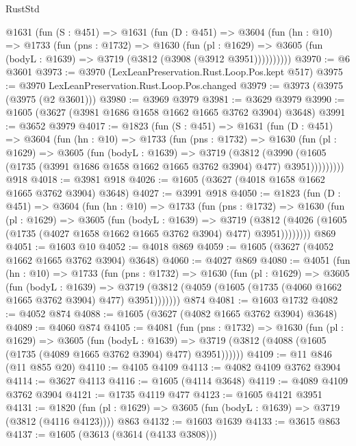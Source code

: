 \begin{lexlean}{RustStd}
\begin{coremodule}
    @1631
      (fun (S : @451) =>
      @1631
        (fun (D : @451) =>
        @3604
          (fun (hn : @10) =>
          @1733
            (fun (pns : @1732) =>
            @1630
              (fun (pl : @1629) =>
              @3605 (fun (bodyL : @1639) => @3719 (@3812 (@3908 (@3912 @3951))))))))))
@3970 := @6 @3601
@3973 := @3970 (LexLeanPreservation.Rust.Loop.Pos.kept @517)
@3975 := @3970 LexLeanPreservation.Rust.Loop.Pos.changed
@3979 := @3973 (@3975 (@3975 (@2 @3601)))
@3980 := @3969 @3979
@3981 := @3629 @3979
@3990 := @1605 (@3627 (@3981 @1686 @1658 @1662 @1665 @3762 @3904) @3648)
@3991 := @3652 @3979
@4017 := @1823
    (fun (S : @451) =>
    @1631
      (fun (D : @451) =>
      @3604
        (fun (hn : @10) =>
        @1733
          (fun (pns : @1732) =>
          @1630
            (fun (pl : @1629) =>
            @3605
              (fun (bodyL : @1639) =>
              @3719
                (@3812
                  (@3990
                    (@1605 (@1735 (@3991 @1686 @1658 @1662 @1665 @3762 @3904) @477) @3951)))))))))
    @918
@4018 := @3981 @918
@4026 := @1605 (@3627 (@4018 @1658 @1662 @1665 @3762 @3904) @3648)
@4027 := @3991 @918
@4050 := @1823
    (fun (D : @451) =>
    @3604
      (fun (hn : @10) =>
      @1733
        (fun (pns : @1732) =>
        @1630
          (fun (pl : @1629) =>
          @3605
            (fun (bodyL : @1639) =>
            @3719
              (@3812 (@4026 (@1605 (@1735 (@4027 @1658 @1662 @1665 @3762 @3904) @477) @3951))))))))
    @869
@4051 := @1603 @10
@4052 := @4018 @869
@4059 := @1605 (@3627 (@4052 @1662 @1665 @3762 @3904) @3648)
@4060 := @4027 @869
@4080 := @4051
    (fun (hn : @10) =>
    @1733
      (fun (pns : @1732) =>
      @1630
        (fun (pl : @1629) =>
        @3605
          (fun (bodyL : @1639) =>
          @3719 (@3812 (@4059 (@1605 (@1735 (@4060 @1662 @1665 @3762 @3904) @477) @3951)))))))
    @874
@4081 := @1603 @1732
@4082 := @4052 @874
@4088 := @1605 (@3627 (@4082 @1665 @3762 @3904) @3648)
@4089 := @4060 @874
@4105 := @4081
    (fun (pns : @1732) =>
    @1630
      (fun (pl : @1629) =>
      @3605
        (fun (bodyL : @1639) =>
        @3719 (@3812 (@4088 (@1605 (@1735 (@4089 @1665 @3762 @3904) @477) @3951))))))
@4109 := @11 @846 (@11 @855 @20)
@4110 := @4105 @4109
@4113 := @4082 @4109 @3762 @3904
@4114 := @3627 @4113
@4116 := @1605 (@4114 @3648)
@4119 := @4089 @4109 @3762 @3904
@4121 := @1735 @4119 @477
@4123 := @1605 @4121 @3951
@4131 := @1820 (fun (pl : @1629) => @3605 (fun (bodyL : @1639) => @3719 (@3812 (@4116 @4123)))) @863
@4132 := @1603 @1639
@4133 := @3615 @863
@4137 := @1605 (@3613 (@3614 (@4133 @3808)))

\end{coremodule}
\end{lexlean}
